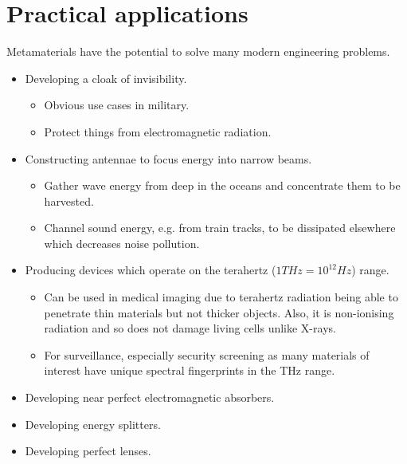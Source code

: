 \section{Practical applications}
\label{applications}
Metamaterials have the potential to solve many modern engineering problems.

\begin{itemize}
\item Developing a cloak of invisibility.\cite{emcloak}
      \begin{itemize}
      \item Obvious use cases in military.
      \item Protect things from electromagnetic radiation.
      \end{itemize}
\item Constructing antennae to focus energy into narrow beams.
      \cite{diremi,antennasol}
      \begin{itemize}
      \item Gather wave energy from deep in the oceans and concentrate them to
            be harvested.
      \item Channel sound energy, e.g. from train tracks, to be dissipated
            elsewhere which decreases noise pollution.
      \end{itemize}
\item Producing devices which operate on the terahertz ($1THz=10^{12}Hz$)
      range.\cite{THz}
      \begin{itemize}
      \item Can be used in medical imaging due to terahertz radiation being
            able to penetrate thin materials but not thicker objects. Also, it
            is non-ionising radiation and so does not damage living cells
            unlike X-rays.
      \item For surveillance, especially security screening as many materials
            of interest have unique spectral fingerprints in the THz
            range.\cite{Thzsec}
      \end{itemize}
\item Developing near perfect electromagnetic absorbers.\cite{absorbing}
\item Developing energy splitters.\cite{toposplit}
\item Developing perfect lenses.\cite{negrefraclens}
\end{itemize}
